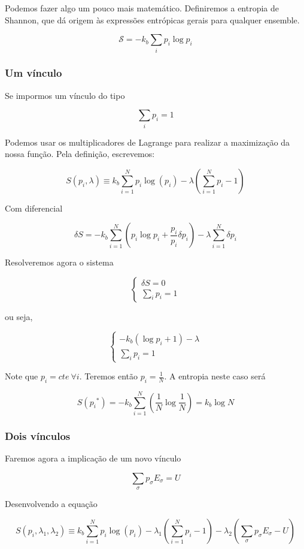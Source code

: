 Podemos fazer algo um pouco mais matemático. Definiremos a entropia de Shannon, que dá origem às expressões entrópicas gerais para qualquer ensemble.

\[
\mathcal{S} = -k_b \sum_{i} p_i \log{p_i}
\]

\subsubsection{Um vínculo}

Se impormos um vínculo do tipo

\[
\sum_{i} p_i = 1
\]

Podemos usar os multiplicadores de Lagrange para realizar a maximização da nossa função. Pela definição, escrevemos:

\[
S({p_i}, \lambda) \equiv k_b \sum_{i=1}^{N} p_i \log{(p_i)} - \lambda \left( \sum_{i=1}^{N}p_i -1 \right) 
\]

Com diferencial

\[
\delta S = - k_b \sum_{i=1}^{N} \left( p_i \log{p_i} + \frac{p_i}{p_i} \delta p_i \right) - \lambda \sum_{i=1}^{N}\delta p_i
\]

Resolveremos agora o sistema

\[
\begin{cases}
	\delta S = 0 \\
	\sum_{i} p_i = 1
\end{cases}
\]

ou seja,

\[
\begin{cases}
	-k_b (\log{p_i} + 1) - \lambda \\
	\sum_{i} p_i = 1
\end{cases}
\]

Note que $p_i = cte \ \forall i$. Teremos então $p_i = \frac{1}{N}$. A entropia neste caso será 

\[
S({p_i}^*) = - k_b \sum_{i=1}^{N} \left( \frac{1}{N} \log{\frac{1}{N}} \right) = k_b \log{N}
\]

\subsubsection{Dois vínculos}

Faremos agora a implicação de um novo vínculo

\[
\sum_{\sigma} p_\sigma E_\sigma = U
\]

Desenvolvendo a equação

\[
S({p_i}, \lambda_1, \lambda_2) \equiv k_b \sum_{i=1}^{N} p_i \log{(p_i)} - \lambda_1 \left( \sum_{i=1}^{N}p_i -1 \right)  - \lambda_2 \left( \sum_\sigma  p_\sigma E_\sigma - U \right) 
\]

